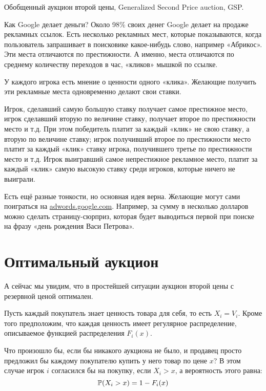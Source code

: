 \begin{myex} Обобщенный аукцион второй цены, Generalized Second Price auction, GSP.

Как Google делает деньги? Около 98\% своих денег Google делает на продаже рекламных ссылок. Есть несколько рекламных мест, которые показываются, когда пользователь запрашивает в поисковике какое-нибудь слово, например «Абрикос». Эти места отличаются по престижности. А именно, места отличаются по среднему количеству переходов в час, «кликов» мышкой по ссылке.

У каждого игрока есть мнение о ценности одного «клика». Желающие получить эти рекламные места одновременно делают свои ставки.

Игрок, сделавший самую большую ставку получает самое престижное место, игрок сделавший вторую по величине ставку, получает второе по престижности место и т.д.  При этом победитель платит за каждый «клик» не свою ставку, а вторую по величине ставку; игрок получивший второе по престижности место платит за каждый «клик» ставку игрока, получившего третье по престижности место и т.д. Игрок выигравший самое непрестижное рекламное место, платит за каждый «клик» самую высокую ставку среди игроков, которые ничего не выиграли.

Есть ещё разные тонкости, но основная идея верна. Желающие могут сами поиграться на \url{adwords.google.com}. Например, за сумму в несколько долларов можно сделать страницу-сюрприз, которая будет выводиться первой при поиске на фразу «день рождения Васи Петрова».
\end{myex}





\section{Оптимальный аукцион}

А сейчас мы увидим, что в простейшей ситуации аукцион второй цены с резервной ценой оптимален.

Пусть каждый покупатель знает ценность товара для себя, то есть  $ X_{i}=V_{i} $. Кроме того предположим, что каждая ценность имеет регулярное распределение, описываемое функцией распределения $ F_{i}(x) $.

Что произошло бы, если бы никакого аукциона не было, и продавец просто предложил бы каждому покупателю купить у него товар по цене $ x $? В этом случае игрок $ i $ согласился бы на покупку, если $ X_{i}>x $, а вероятность этого равна:
\begin{equation}
\P(X_{i}>x)=1-F_{i}(x)
\end{equation}

